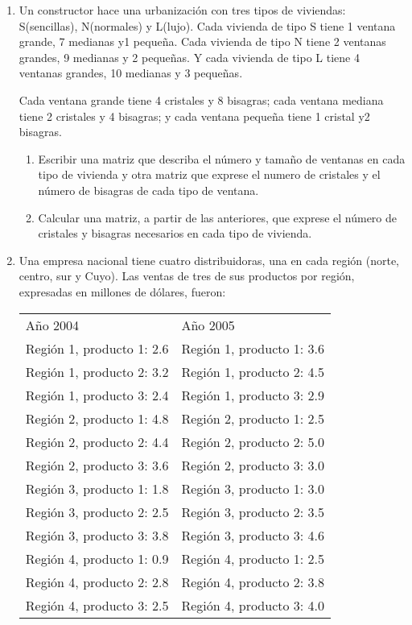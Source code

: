\documentclass[12pt]{article}
\begin{document}
\begin{enumerate}
\item Un constructor hace una urbanización con tres tipos de viviendas: S(sencillas), N(normales) y L(lujo). Cada vivienda de tipo S tiene 1 ventana grande, 7 medianas y1 pequeña. Cada vivienda de tipo N tiene 2 ventanas grandes, 9 medianas y 2 pequeñas. Y cada vivienda de tipo L tiene 4 ventanas grandes, 10 medianas y 3 pequeñas.

Cada ventana grande tiene 4 cristales y 8 bisagras; cada ventana mediana tiene 2 cristales y 4 bisagras; y cada ventana pequeña tiene 1 cristal y2 bisagras.
\begin{enumerate}
  \item Escribir una matriz que describa el número y tamaño de ventanas en cada tipo de vivienda y otra matriz que exprese el numero de cristales y el número de bisagras de cada tipo de ventana.
  \item Calcular una matriz, a partir de las anteriores, que exprese el número de cristales y bisagras necesarios en cada tipo de vivienda.
\end{enumerate}
\item Una empresa nacional tiene cuatro distribuidoras, una en cada región (norte, centro, sur y
Cuyo). Las ventas de tres de sus productos por región, expresadas en millones de dólares,
fueron:\\
\begin{tabular}{ll}
Año 2004 & Año 2005\\
Región 1, producto 1: 2.6 & Región 1, producto 1: 3.6\\
Región 1, producto 2: 3.2 & Región 1, producto 2: 4.5\\
Región 1, producto 3: 2.4 & Región 1, producto 3: 2.9\\
Región 2, producto 1: 4.8 & Región 2, producto 1: 2.5\\
Región 2, producto 2: 4.4 & Región 2, producto 2: 5.0\\
Región 2, producto 3: 3.6 & Región 2, producto 3: 3.0\\
Región 3, producto 1: 1.8 & Región 3, producto 1: 3.0\\
Región 3, producto 2: 2.5 & Región 3, producto 2: 3.5\\
Región 3, producto 3: 3.8 & Región 3, producto 3: 4.6\\
Región 4, producto 1: 0.9 & Región 4, producto 1: 2.5\\
Región 4, producto 2: 2.8 & Región 4, producto 2: 3.8\\
Región 4, producto 3: 2.5 & Región 4, producto 3: 4.0

\end{tabular}
\end{enumerate}
\end{document}
